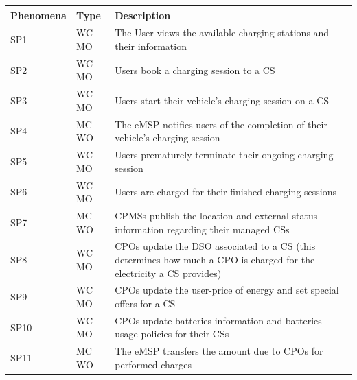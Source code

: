 \documentclass[11pt]{article}
\begin{document}
\begin{table}[H]
    \centering
    \setlength{\tabcolsep}{18pt}
    \renewcommand{\arraystretch}{1.2}
    \begin{tabularx}{\textwidth}{|>{\centering\hsize=0.3\hsize}X|>{\centering\hsize=0.3\hsize}X|>{\hsize=1.4\hsize}X|}
        \hline
        \textbf{Phenomena} & \textbf{Type} & \textbf{Description} \\
        \hline
        SP1 & WC MO & The User views the available charging stations and their information \\
        \hline
        SP2 & WC MO & Users book a charging session to a CS \\
        \hline
        SP3 & WC MO & Users start their vehicle's charging session on a CS \\
        \hline
        SP4 & MC WO & The eMSP notifies users of the completion of their vehicle's charging session \\
        \hline
        SP5 & WC MO & Users prematurely terminate their ongoing charging session \\
        \hline
        SP6 & WC MO & Users are charged for their finished charging sessions \\
        \hline
        SP7 & MC WO & CPMSs publish the location and external status information regarding their managed CSs \\
        \hline
        SP8 & WC MO & CPOs update the DSO associated to a CS (this determines how much a CPO is charged for the electricity a CS provides) \\
        \hline
        SP9 & WC MO & CPOs update the user-price of energy and set special offers for a CS \\
        \hline
        SP10 & WC MO & CPOs update batteries information and batteries usage policies for their CSs \\
        \hline
        SP11 & MC WO & The eMSP transfers the amount due to CPOs for performed charges \\
        \hline
    \end{tabularx}
    \label{tab:shared_phenomena}
\end{table}
\end{document}
